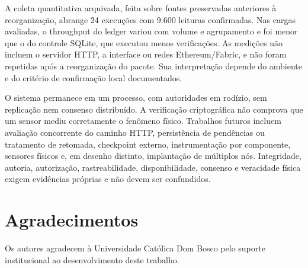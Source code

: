 \documentclass[10pt,a4paper,twocolumn]{article}
\begin{document}
A coleta quantitativa arquivada, feita sobre fontes preservadas anteriores à reorganização, abrange 24 execuções com 9.600 leituras confirmadas. Nas cargas avaliadas, o throughput do ledger variou com volume e agrupamento e foi menor que o do controle SQLite, que executou menos verificações. As medições não incluem o servidor HTTP, a interface ou redes Ethereum/Fabric, e não foram repetidas após a reorganização do pacote. Sua interpretação depende do ambiente e do critério de confirmação local documentados.

O sistema permanece em um processo, com autoridades em rodízio, sem replicação nem consenso distribuído. A verificação criptográfica não comprova que um sensor mediu corretamente o fenômeno físico. Trabalhos futuros incluem avaliação concorrente do caminho HTTP, persistência de pendências ou tratamento de retomada, checkpoint externo, instrumentação por componente, sensores físicos e, em desenho distinto, implantação de múltiplos nós. Integridade, autoria, autorização, rastreabilidade, disponibilidade, consenso e veracidade física exigem evidências próprias e não devem ser confundidos.

\section*{Agradecimentos}
Os autores agradecem à Universidade Católica Dom Bosco pelo suporte institucional ao desenvolvimento deste trabalho.

\clearpage\balance

\end{document}
